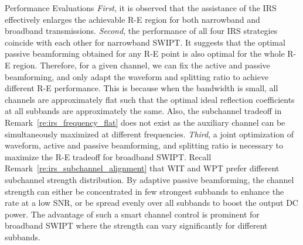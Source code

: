 \documentclass[journal]{IEEEtran}
\begin{document}
\begin{section}{Performance Evaluations}
		\textit{First}, it is observed that the assistance of the IRS effectively enlarges the achievable R-E region for both narrowband and broadband transmissions. \textit{Second}, the performance of all four IRS strategies coincide with each other for narrowband SWIPT. It suggests that the optimal passive beamforming obtained for any R-E point is also optimal for the whole R-E region. Therefore, for a given channel, we can fix the active and passive beamforming, and only adapt the waveform and splitting ratio to achieve different R-E performance. This is because when the bandwidth is small, all channels are approximately flat such that the optimal ideal reflection coefficients at all subbands are approximately the same. Also, the subchannel tradeoff in Remark~\ref{re:irs_frequency_flat} does not exist as the auxiliary channel can be simultaneously maximized at different frequencies. \textit{Third}, a joint optimization of waveform, active and passive beamforming, and splitting ratio is necessary to maximize the R-E tradeoff for broadband SWIPT. Recall Remark~\ref{re:irs_subchannel_alignment} that WIT and WPT prefer different subchannel strength distribution. By adaptive passive beamforming, the channel strength can either be concentrated in few strongest subbands to enhance the rate at a low SNR, or be spread evenly over all subbands to boost the output DC power. The advantage of such a smart channel control is prominent for broadband SWIPT where the strength can vary significantly for different subbands.
	\end{section}
\end{document}
